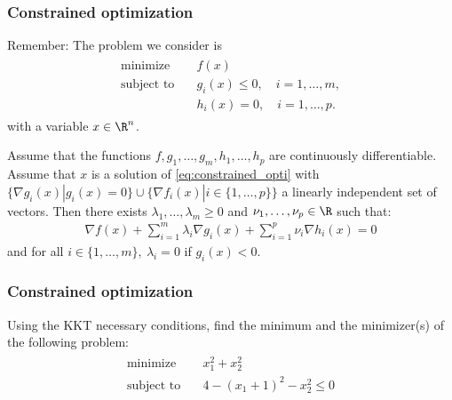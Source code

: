 \documentclass{beamer}
\begin{document}
\begin{frame}[t]
\frametitle{Constrained optimization}
\vspace{-12pt}
Remember: The problem we consider is
\begin{align} 
\begin{split} \label{eq:constrained_opti}
\text{minimize} \quad &f(x) \\
\text{subject to} \quad &g_i(x) \leq 0, \quad i = 1,  \dots, m, \\
                            &h_i(x) = 0, \quad i = 1, \dots, p.
\end{split}
\end{align}
with a variable $x \in \R^n$.
\begin{theorem}
Assume that the functions $f, g_1, \dots, g_m, h_1, \dots, h_p$ are continuously differentiable. Assume that $x$ is a solution of \eqref{eq:constrained_opti} with $\{\nabla g_i(x) | g_i(x) = 0 \} \cup \{ \nabla f_i(x) | i \in \{1,\dots,p\} \}$ a linearly independent set of vectors. Then there exists $\lambda_1, \dots, \lambda_m \geq 0$ and $\nu_1, \dots, \nu_p \in \R$ such that:
\begin{align*}
\nabla f(x) + \sum_{i=1}^m \lambda_i \nabla g_i(x) + \sum_{i=1}^p \nu_i \nabla h_i(x) = 0
\end{align*}
and for all $i \in \{1, \dots, m\}, \ \lambda_i = 0$ if $g_i(x) < 0$.
\end{theorem}
\end{frame}

\begin{frame}[t]
\frametitle{Constrained optimization}
\vspace{-12pt}
Using the KKT necessary conditions, find the minimum and the minimizer(s) of the following problem:
\begin{align*} 
\begin{split} 
\text{minimize} \quad &x_1^2 + x_2^2 \\
\text{subject to} \quad & 4 - (x_1+1)^2 - x_2^2 \leq 0
\end{split}
\end{align*}
\pause
\pause
\end{frame}
\end{document}
